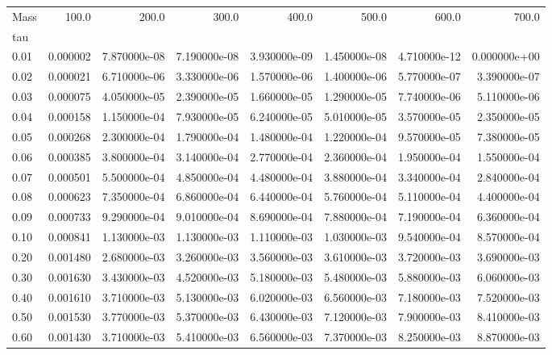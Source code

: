 \begin{tabular}{lrrrrrrr}
\toprule
Mass &     100.0 &         200.0 &         300.0 &         400.0 &         500.0 &         600.0 &         700.0 \\
tau   &           &               &               &               &               &               &               \\
\midrule
0.01  &  0.000002 &  7.870000e-08 &  7.190000e-08 &  3.930000e-09 &  1.450000e-08 &  4.710000e-12 &  0.000000e+00 \\
0.02  &  0.000021 &  6.710000e-06 &  3.330000e-06 &  1.570000e-06 &  1.400000e-06 &  5.770000e-07 &  3.390000e-07 \\
0.03  &  0.000075 &  4.050000e-05 &  2.390000e-05 &  1.660000e-05 &  1.290000e-05 &  7.740000e-06 &  5.110000e-06 \\
0.04  &  0.000158 &  1.150000e-04 &  7.930000e-05 &  6.240000e-05 &  5.010000e-05 &  3.570000e-05 &  2.350000e-05 \\
0.05  &  0.000268 &  2.300000e-04 &  1.790000e-04 &  1.480000e-04 &  1.220000e-04 &  9.570000e-05 &  7.380000e-05 \\
0.06  &  0.000385 &  3.800000e-04 &  3.140000e-04 &  2.770000e-04 &  2.360000e-04 &  1.950000e-04 &  1.550000e-04 \\
0.07  &  0.000501 &  5.500000e-04 &  4.850000e-04 &  4.480000e-04 &  3.880000e-04 &  3.340000e-04 &  2.840000e-04 \\
0.08  &  0.000623 &  7.350000e-04 &  6.860000e-04 &  6.440000e-04 &  5.760000e-04 &  5.110000e-04 &  4.400000e-04 \\
0.09  &  0.000733 &  9.290000e-04 &  9.010000e-04 &  8.690000e-04 &  7.880000e-04 &  7.190000e-04 &  6.360000e-04 \\
0.10  &  0.000841 &  1.130000e-03 &  1.130000e-03 &  1.110000e-03 &  1.030000e-03 &  9.540000e-04 &  8.570000e-04 \\
0.20  &  0.001480 &  2.680000e-03 &  3.260000e-03 &  3.560000e-03 &  3.610000e-03 &  3.720000e-03 &  3.690000e-03 \\
0.30  &  0.001630 &  3.430000e-03 &  4.520000e-03 &  5.180000e-03 &  5.480000e-03 &  5.880000e-03 &  6.060000e-03 \\
0.40  &  0.001610 &  3.710000e-03 &  5.130000e-03 &  6.020000e-03 &  6.560000e-03 &  7.180000e-03 &  7.520000e-03 \\
0.50  &  0.001530 &  3.770000e-03 &  5.370000e-03 &  6.430000e-03 &  7.120000e-03 &  7.900000e-03 &  8.410000e-03 \\
0.60  &  0.001430 &  3.710000e-03 &  5.410000e-03 &  6.560000e-03 &  7.370000e-03 &  8.250000e-03 &  8.870000e-03 \\

\end{tabular}
